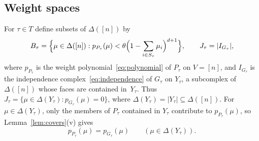 \documentclass[11pt]{article}
\theoremstyle{definition}
\numberwithin{equation}{section}
\begin{document}
\subsection{Weight spaces}

For $\tau\in T$ define subsets of $\Delta([n])$ by
\begin{equation}\label{eq:weightspace}
 B_\tau=\Bigl\{\mu\in\Delta([n]):p_{P_\tau}(\mu)<\theta\Bigl(1-\sum_{i\in S_\tau}\mu_i\Bigr)^{d+1}\Bigr\},\qquad
 J_\tau=|I_{G_\tau}|,
\end{equation}
where $p_{P_\tau}$ is the weight polynomial~\eqref{eq:polynomial} of $P_\tau$ on $V=[n]$, and $I_{G_\tau}$ is the independence complex~\eqref{eq:independence} of $G_\tau$ on $Y_\tau$, a subcomplex of $\Delta([n])$ whose faces are contained in~$Y_\tau$. Thus $J_\tau=\{\mu\in\Delta(Y_\tau):p_{G_\tau}(\mu)=0\}$, where $\Delta(Y_\tau)=|Y_\tau|\subseteq\Delta([n])$. For $\mu\in\Delta(Y_\tau)$, only the members of $P_\tau$ contained in $Y_\tau$ contribute to $p_{P_\tau}(\mu)$, so Lemma~\ref{lem:covers}(v) gives
\begin{equation}\label{eq:restrict}
 p_{P_\tau}(\mu)=p_{G_\tau}(\mu)\qquad(\mu\in\Delta(Y_\tau)).
\end{equation}
\end{document}
